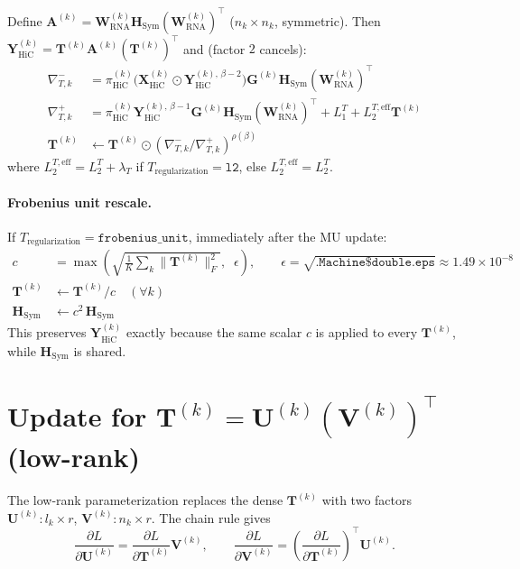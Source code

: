 \documentclass[11pt]{article}
\newcommand{\mat}[1]{\mathbf{#1}}
\newcommand{\Hada}{\odot}
\newcommand{\sci}[1]{\mathrm{#1}}
\begin{document}
Define $\mat{A}^{(k)} = \mat{W}_{\sci{RNA}}^{(k)} \mat{H}_{\sci{Sym}} (\mat{W}_{\sci{RNA}}^{(k)})^\top$ ($n_k \times n_k$, symmetric). Then $\mat{Y}_{\sci{HiC}}^{(k)} = \mat{T}^{(k)} \mat{A}^{(k)} (\mat{T}^{(k)})^\top$ and (factor $2$ cancels):
\begin{align}
\nabla^-_{T, k} &= \pi_{\sci{HiC}}^{(k)} \big( \mat{X}_{\sci{HiC}}^{(k)} \Hada \mat{Y}_{\sci{HiC}}^{(k),\,\beta-2} \big) \mat{G}^{(k)} \mat{H}_{\sci{Sym}} (\mat{W}_{\sci{RNA}}^{(k)})^\top \\
\nabla^+_{T, k} &= \pi_{\sci{HiC}}^{(k)} \mat{Y}_{\sci{HiC}}^{(k),\,\beta-1} \mat{G}^{(k)} \mat{H}_{\sci{Sym}} (\mat{W}_{\sci{RNA}}^{(k)})^\top
                  + L_1^{T} + L_2^{T,\sci{eff}} \mat{T}^{(k)} \\
\mat{T}^{(k)} &\leftarrow \mat{T}^{(k)} \Hada
                  \left( \nabla^-_{T, k} \big/ \nabla^+_{T, k} \right)^{\rho(\beta)}
\end{align}
where $L_2^{T,\sci{eff}} = L_2^{T} + \lambda_T$ if $T_{\text{regularization}} = \texttt{l2}$, else $L_2^{T,\sci{eff}} = L_2^{T}$.

\paragraph{Frobenius unit rescale.} If $T_{\text{regularization}} = \texttt{frobenius\_unit}$, immediately after the MU update:
\begin{align}
c &= \max\!\left( \sqrt{\tfrac{1}{K} \textstyle\sum_k \|\mat{T}^{(k)}\|_F^2}, \;\; \epsilon \right),
   \qquad \epsilon = \sqrt{\texttt{.Machine\$double.eps}} \approx 1.49 \times 10^{-8} \\
\mat{T}^{(k)} &\leftarrow \mat{T}^{(k)} / c \quad (\forall k) \\
\mat{H}_{\sci{Sym}} &\leftarrow c^2 \, \mat{H}_{\sci{Sym}}
\end{align}
This preserves $\mat{Y}_{\sci{HiC}}^{(k)}$ exactly because the same scalar $c$ is applied to every $\mat{T}^{(k)}$, while $\mat{H}_{\sci{Sym}}$ is shared.

\section{Update for $\mat{T}^{(k)} = \mat{U}^{(k)} (\mat{V}^{(k)})^\top$ (low-rank)}

The low-rank parameterization replaces the dense $\mat{T}^{(k)}$ with two factors $\mat{U}^{(k)}: l_k \times r$, $\mat{V}^{(k)}: n_k \times r$. The chain rule gives
\[
\frac{\partial L}{\partial \mat{U}^{(k)}} = \frac{\partial L}{\partial \mat{T}^{(k)}} \mat{V}^{(k)},
\qquad
\frac{\partial L}{\partial \mat{V}^{(k)}} = \left( \frac{\partial L}{\partial \mat{T}^{(k)}} \right)^{\!\!\top} \mat{U}^{(k)}.
\]
\end{document}
